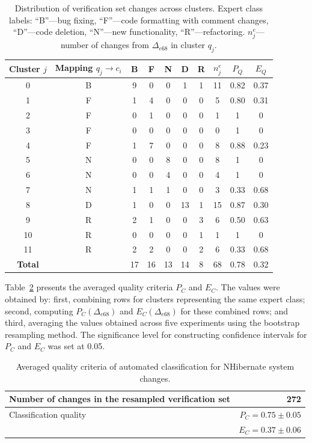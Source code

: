 \documentclass[11pt,a4paper]{article}
\begin{document}
\begin{table}[ht]
\centering
\caption{Distribution of verification set changes across clusters. Expert class labels: ``B''---bug fixing, ``F''---code formatting with comment changes, ``D''---code deletion, ``N''---new functionality, ``R''---refactoring. $n_j^e$---number of changes from $\Delta_{e68}$ in cluster $q_j$.}
\label{tab:clusters}
\small
\begin{tabular}{@{}cccccccccc@{}}
\toprule
Cluster $j$ & Mapping $q_j \rightarrow c_i$ & B & F & N & D & R & $n_j^e$ & $P_Q$ & $E_Q$ \\
\midrule
0  & B   & 9 & 0 & 0 & 1 & 1 & 11 & 0.82 & 0.37 \\
1  & F   & 1 & 4 & 0 & 0 & 0 &  5 & 0.80 & 0.31 \\
2  & F   & 0 & 1 & 0 & 0 & 0 &  1 & 1    & 0    \\
3  & F   & 0 & 0 & 0 & 0 & 0 &  0 & 1    & 0    \\
4  & F   & 1 & 7 & 0 & 0 & 0 &  8 & 0.88 & 0.23 \\
5  & N   & 0 & 0 & 8 & 0 & 0 &  8 & 1    & 0    \\
6  & N   & 0 & 0 & 4 & 0 & 0 &  4 & 1    & 0    \\
7  & N   & 1 & 1 & 1 & 0 & 0 &  3 & 0.33 & 0.68 \\
8  & D   & 1 & 0 & 0 & 13& 1 & 15 & 0.87 & 0.30 \\
9  & R   & 2 & 1 & 0 & 0 & 3 &  6 & 0.50 & 0.63 \\
10 & R   & 0 & 0 & 0 & 0 & 1 &  1 & 1    & 0    \\
11 & R   & 2 & 2 & 0 & 0 & 2 &  6 & 0.33 & 0.68 \\
\midrule
\textbf{Total} & & 17 & 16 & 13 & 14 & 8 & 68 & 0.78 & 0.32 \\
\bottomrule
\end{tabular}
\end{table}

Table~\ref{tab:quality} presents the averaged quality criteria $P_C$ and $E_C$. The values were obtained by: first, combining rows for clusters representing the same expert class; second, computing $P_C(\Delta_{e68})$ and $E_C(\Delta_{e68})$ for these combined rows; and third, averaging the values obtained across five experiments using the bootstrap resampling method. The significance level for constructing confidence intervals for $P_C$ and $E_C$ was set at 0.05.

\begin{table}[ht]
\centering
\caption{Averaged quality criteria of automated classification for NHibernate system changes.}
\label{tab:quality}
\begin{tabular}{@{}lr@{}}
\toprule
Number of changes in the resampled verification set & 272 \\
\midrule
Classification quality & $P_C = 0.75 \pm 0.05$ \\
                        & $E_C = 0.37 \pm 0.06$ \\
\bottomrule
\end{tabular}
\end{table}
\end{document}
